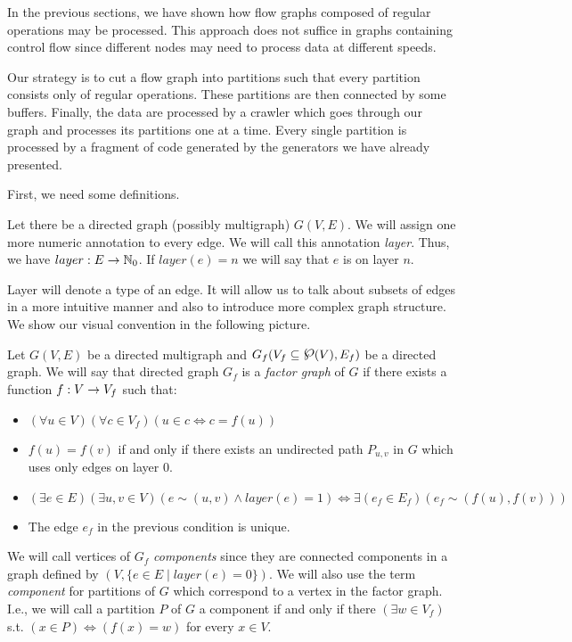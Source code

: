 
\label{sec:partitioning}

In the previous sections, we have shown how flow graphs composed of regular operations may be processed. This approach does not suffice in graphs containing control flow since different nodes may need to process data at different speeds. 

Our strategy is to cut a flow graph into partitions such that every partition consists only of regular operations. These partitions are then connected by some buffers. Finally, the data are processed by a crawler which  goes through our graph and processes its partitions one at a time. Every single partition is processed by a fragment of code generated by the generators we have already presented. 

First, we need some definitions.

  Let there be a directed graph (possibly multigraph) $G(V,E)$. We will assign one more numeric annotation to every edge. We will call this annotation \emph{layer}. Thus, we have $layer: E \rightarrow \mathbb{N}_0$. If $layer(e) = n$ we will say that $e$ is on layer $n$. 
\myenddef

Layer will denote a type of an edge. It will allow us to talk about subsets of edges in a more intuitive manner and also to introduce more complex graph structure. We show our visual convention in the following picture.


  Let $G(V,E)$ be a directed multigraph and $G_f(V_f \subseteq \powerset(V),E_f)$ be a directed graph. We will say that directed graph $G_f$ is a \emph{factor graph} of $G$ if there exists a function $f: V \rightarrow V_f$ such that:
  \begin{itemize}
    \item $(\forall u \in V)(\forall c \in V_f)( u \in c \Longleftrightarrow c = f(u)) $
    \item $f(u) = f(v)$ if and only if there exists an undirected path $P_{u,v}$ in $G$ which uses only edges on layer 0.
    \item $(\exists e \in E)(\exists u,v \in V)(e \sim (u,v) \land layer(e) = 1) \Longleftrightarrow \exists(e_f \in E_f)( e_f \sim (f(u), f(v)) )$  
    \item The edge $e_f$ in the previous condition is unique.
  \end{itemize}
  We will call vertices of $G_f$ \emph{components} since they are connected components in a graph defined by $(V, \{e \in E \mid layer(e) = 0 \})$. We will also use the term \emph{component} for partitions of $G$ which correspond to a vertex in the factor graph. I.e., we will call a partition $P$ of $G$ a component if and only if there $(\exists w \in V_f)$ s.t. $(x \in P) \Longleftrightarrow ( f(x) = w)$ for every $x \in V$.
\myenddef

